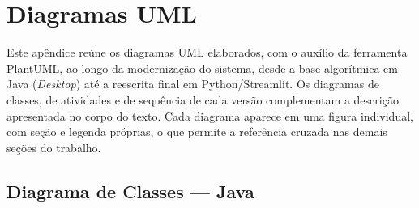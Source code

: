 \chapter{Diagramas UML}
\label{cha:testesgraficos}

Este apêndice reúne os diagramas \gls{UML} elaborados, com o auxílio da
ferramenta PlantUML, ao longo da modernização do sistema, desde a base
algorítmica em Java (\textit{Desktop}) até a reescrita final em
Python/Streamlit. Os diagramas de classes, de atividades e de sequência de cada
versão complementam a descrição apresentada no corpo do texto. Cada diagrama
aparece em uma figura individual, com seção e legenda próprias, o que permite
a referência cruzada nas demais seções do trabalho.








\section{Diagrama de Classes --- Java}
\label{sec:diagclassejava}


